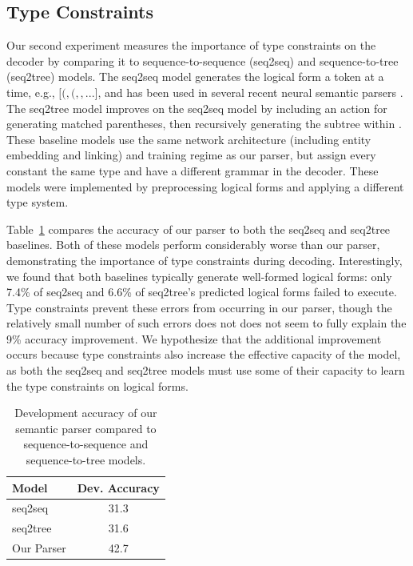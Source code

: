 \subsection{Type Constraints}

Our second experiment measures the importance of type constraints on the decoder by comparing it to sequence-to-sequence (seq2seq) and sequence-to-tree (seq2tree) models.
The seq2seq model generates the logical form a token at a time, e.g., $[ (, (,$$, ... ]$,
and has been used in several recent neural semantic parsers \cite{jia2016,dong2016}.
The seq2tree model improves on the seq2seq model by including an action for generating matched parentheses, then recursively generating the subtree within \cite{dong2016}.
These baseline models use the same network architecture (including entity embedding and linking) and training regime as our parser, but assign every constant the same type and have a different grammar in the decoder.
These models were implemented by preprocessing logical forms and applying a different type system.

Table~\ref{tab:typing_results} compares the accuracy of our parser to both the seq2seq and seq2tree baselines.
Both of these models perform considerably worse than our parser, demonstrating the importance of type constraints during decoding. 
Interestingly, we found that both baselines typically generate well-formed logical forms: only 7.4\% of seq2seq and 6.6\% of seq2tree's predicted logical forms failed to execute.
Type constraints prevent these errors from occurring in our parser, though the relatively small number of such errors does not does not seem to fully explain the 9\% accuracy improvement.
We hypothesize that the additional improvement occurs because type constraints also increase the effective capacity of the model, as both the seq2seq and seq2tree models must use some of their capacity to learn the type constraints on logical forms.

\begin{table}[]
	\centering
	\begin{tabular}{lc} \toprule
	\textbf{Model} & \textbf{Dev. Accuracy} \\ \midrule
	seq2seq & 31.3 \\
	seq2tree & 31.6 \\
	Our Parser & 42.7 \\ \bottomrule
	\end{tabular}
	\caption{Development accuracy of our semantic parser compared to sequence-to-sequence and sequence-to-tree models.}\label{tab:typing_results}
\end{table}

